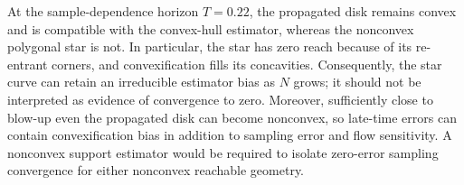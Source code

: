 At the sample-dependence horizon $T=0.22$, the propagated disk remains convex
and is compatible with the convex-hull estimator, whereas the nonconvex
polygonal star is not.  In particular, the star has zero reach because of its
re-entrant corners, and convexification fills its concavities.  Consequently,
the star curve can retain an irreducible estimator bias as $N$ grows; it should
not be interpreted as evidence of convergence to zero.  Moreover, sufficiently
close to blow-up even the propagated disk can become nonconvex, so late-time
errors can contain convexification bias in addition to sampling error and flow
sensitivity.  A nonconvex support estimator would be required to isolate
zero-error sampling convergence for either nonconvex reachable geometry.
